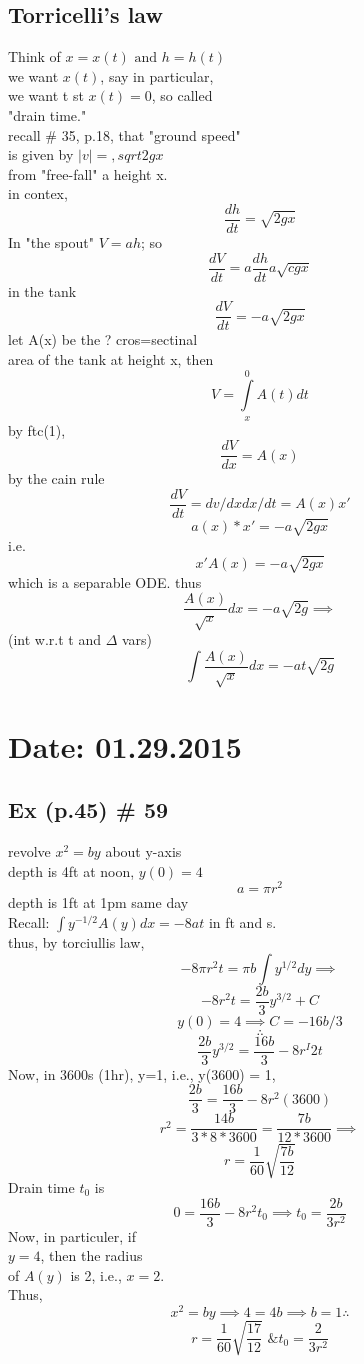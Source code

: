   \subsection*{Torricelli's law}
  Think of $x = x(t) \text{ and } h = h(t)$ \\
  we want $x(t)$, say in particular,  \\
  we want t st $x(t) = 0$, so called  \\
  "drain time." \\
  recall \# 35, p.18, that "ground speed" \\
  is given by $|v|=,sqrt{2gx}$ \\
  from "free-fall" a height x.  \\
  in contex, 
  $$\frac{dh}{dt}= \sqrt{2gx}$$
  In "the spout" $V=ah$; so
  $$\frac{dV}{dt}= a\frac{dh}{dt}a\sqrt{cgx}$$
  in the tank 
  $$\frac{dV}{dt}= -a\sqrt{2gx}$$
  let A(x) be the ? cros=sectinal \\
  area of the tank at height x, then  \\
  $$V= \int\limits_{x}^{0}A(t)dt$$
   by ftc(1),
   $$\frac{dV}{dx}= A(x)$$
   by the cain rule
   $$\frac{dV}{dt}= dv/dx dx/dt = A(x)x'$$
   $$a(x)*x' = -a \sqrt{2gx}$$
   i.e.
   $$x'A(x)= -a\sqrt{2gx}$$
   which is a separable ODE. thus
   $$\frac{A(x)}{\sqrt{x}} dx = -a\sqrt{2g} \implies$$
   (int w.r.t t and $\Delta$ vars)
   $$\int \frac{A(x)}{\sqrt{x}} dx= -at\sqrt{2g}$$

\newpage
{}
\section{Date: 01.29.2015}
  
  \subsection*{Ex (p.45) \# 59} 
  revolve \(x^2 = by\) about y-axis \\	
  depth is 4ft at noon, \(y(0) = 4\)
  \[a = \pi r^2\]
  depth is 1ft at 1pm same day  \\
  Recall: \(\int y^{-1/2} A(y)dx= -8at\) in ft and s. \\
  thus, by torciullis law,  \\
  \[-8 \pi r^2t = \pi b \int y^{1/2}dy \implies \]
  \[-8r^2t = \frac{2b}{3} y^{3/2} + C\]
  \[y(0) = 4 \implies C = -16b/3\]
  \[\therefore\]
  \[\frac{2b}{3} y^{3/2}= \frac{16b}{3}-8 r^I 2t\]
  Now, in 3600s (1hr), y=1, i.e., y(3600) = 1, 
  \[\frac{2b}{3} = \frac{16b}{3}-8r^2(3600)\]
  \[r^2 = \frac{14b}{3*8*3600} = \frac{7b}{12*3600} \implies \]
  \[r = \frac{1}{60} \sqrt{\frac{7b}{12}}\]
  Drain time \(t_0\) is 
  \[0 = \frac{16b}{3} - 8r^2t_0 \implies t_0 = \frac{2b}{3r^2}\]
  Now, in particuler, if  \\
  \( y = 4 \), then the radius  \\
  of \( A(y) \) is 2, i.e., \( x = 2 \). \\ 
  Thus,
  \[x^2 = by \implies 4 = 4b \implies b=1 \therefore\]  
  \[r = \frac{1}{60} \sqrt{\frac{17}{12}}   \text{ \& } t_0 =
  \frac{2}{3r^2}\]

